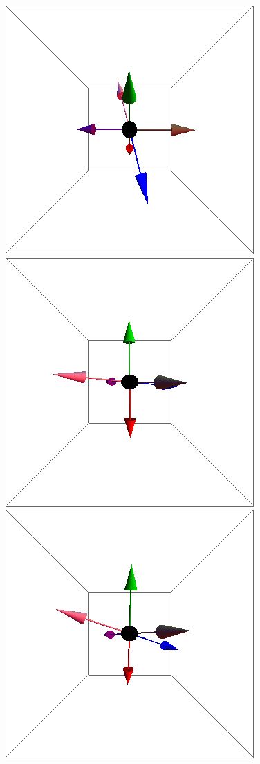 \documentclass{article}
\begin{document}
\begin{figure}[ht]
\centering
\includegraphics[scale=0.22]{100/1S000to005R.png}
\includegraphics[scale=0.22]{100/2S000to005R.png}
\includegraphics[scale=0.22]{100/48S000to005R.png}

\end{figure}
\end{document}
